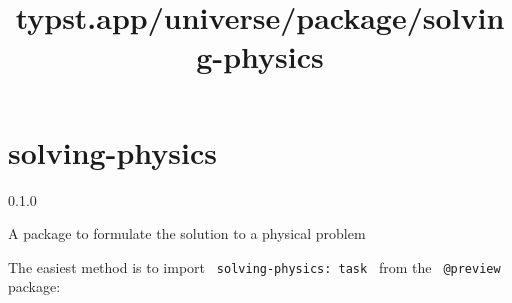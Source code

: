 \title{typst.app/universe/package/solving-physics}

\label{banner}
\section{solving-physics}\label{solving-physics}

{ 0.1.0 }

A package to formulate the solution to a physical problem

\label{readme}
The easiest method is to import \texttt{\ solving-physics:\ task\ } from
the \texttt{\ @preview\ } package:

\begin{Shaded}
\begin{Highlighting}[]
\end{Highlighting}
\end{Shaded}

\begin{Shaded}
\begin{Highlighting}[]
\NormalTok{  given: [}
\NormalTok{  ],}
\NormalTok{  find: [}
\NormalTok{  ],}
\NormalTok{)[}
\NormalTok{]}
\end{Highlighting}
\end{Shaded}


\begin{Shaded}
\begin{Highlighting}[]
\NormalTok{  given: [}
\NormalTok{  ],}
\NormalTok{  find: [}
\NormalTok{  ],}
\NormalTok{)[]}
\end{Highlighting}
\end{Shaded}

\pandocbounded{}

\begin{Shaded}
\begin{Highlighting}[]
\NormalTok{  given: [}
\NormalTok{  ],}
\NormalTok{  find: [}
\NormalTok{  ],}
\NormalTok{)[]}
\end{Highlighting}
\end{Shaded}

